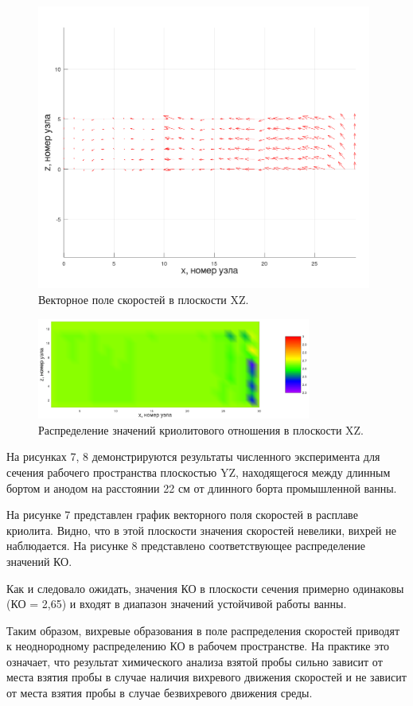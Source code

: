 \documentclass{article}
\begin{document}
\begin{figure}[H]
    \centering
    \includegraphics[width=110mm]{veloxz_art.png}
    \caption{Векторное поле скоростей в плоскости XZ.}
    \label{fig:3dxyvelo2} 
\end{figure}

\begin{figure}[H]
    \centering
    \includegraphics[width=90mm]{3d xz cr.png}
    \caption{Распределение значений криолитового отношения в плоскости XZ.}
    \label{fig:3dxycr2} 
\end{figure}

На рисунках 7, 8 демонстрируются результаты численного эксперимента для сечения рабочего пространства плоскостью YZ, находящегося между длинным бортом и анодом на расстоянии 22 см от длинного борта промышленной ванны.	

На рисунке 7 представлен график векторного поля скоростей в расплаве криолита. Видно, что в этой плоскости значения скоростей невелики, вихрей не наблюдается. На рисунке 8 представлено соответствующее распределение значений КО.

Как и следовало ожидать, значения КО в плоскости сечения примерно одинаковы (КО = 2,65) и входят в диапазон значений устойчивой работы ванны. 

Таким образом, вихревые образования в поле распределения скоростей приводят к неоднородному распределению КО в рабочем пространстве. На практике это означает, что результат химического анализа взятой пробы сильно зависит от места взятия пробы в случае наличия вихревого движения скоростей и не зависит от места взятия пробы в случае безвихревого движения среды.
\end{document}
